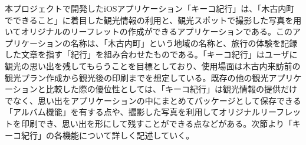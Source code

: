 本プロジェクトで開発したiOSアプリケーション「キーコ紀行」は、「木古内町でできること」に着目した観光情報の利用と、観光スポットで撮影した写真を用いてオリジナルのリーフレットの作成ができるアプリケーションである。このアプリケーションの名称は、「木古内町」という地域の名称と、旅行の体験を記録した文章を指す「紀行」を組み合わせたものである。「キーコ紀行」はユーザに観光の思い出を残してもらうことを目標としており、使用場面は木古内来訪前の観光プラン作成から観光後の印刷までを想定している。既存の他の観光アプリケーションと比較した際の優位性としては、「キーコ紀行」は観光情報の提供だけでなく、思い出をアプリケーションの中にまとめてパッケージとして保存できる「アルバム機能」を有する点や、撮影した写真を利用してオリジナルリーフレットを印刷でき、思い出を形にして残すことができる点などがある。次節より「キーコ紀行」の各機能について詳しく記述していく。

